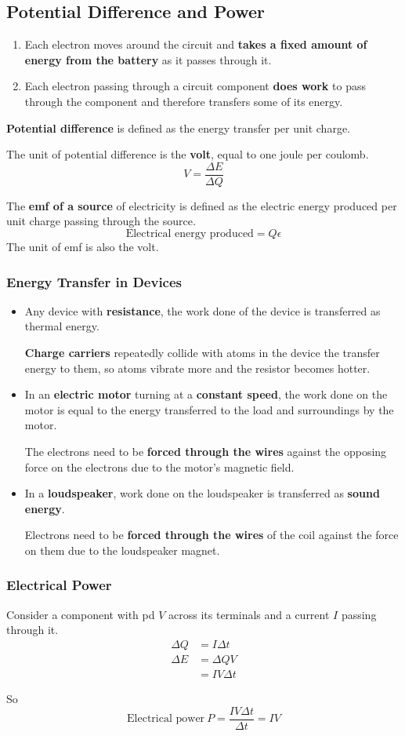\subsection{Potential Difference and Power}

\begin{enumerate}
    \item Each electron moves around the circuit and \textbf{takes a fixed amount of energy from the battery} as it passes through it.
    \item Each electron passing through a circuit component \textbf{does work} to pass through the component and therefore transfers some of its energy.
\end{enumerate}

\textbf{Potential difference} is defined as the energy transfer per unit charge.

The unit of potential difference is the \textbf{volt}, equal to one joule per coulomb.
$$V=\frac{\Delta E}{\Delta Q}$$

The \textbf{emf of a source} of electricity is defined as the electric energy produced per unit charge passing through the source.
$$\text{Electrical energy produced}=Q\epsilon$$
The unit of emf is also the volt.

\subsubsection*{Energy Transfer in Devices}
\begin{itemize}
    \item Any device with \textbf{resistance}, the work done of the device is transferred as thermal energy.

        \textbf{Charge carriers} repeatedly collide with atoms in the device the transfer energy to them, so atoms vibrate more and the resistor becomes hotter.
    \item In an \textbf{electric motor} turning at a \textbf{constant speed}, the work done on the motor is equal to the energy transferred to the load and surroundings by the motor.

        The electrons need to be \textbf{forced through the wires} against the opposing force on the electrons due to the motor's magnetic field.
    \item In a \textbf{loudspeaker}, work done on the loudspeaker is transferred as \textbf{sound energy}.

        Electrons need to be \textbf{forced through the wires} of the coil against the force on them due to the loudspeaker magnet.
\end{itemize}

\subsubsection*{Electrical Power}

Consider a component with pd $V$ across its terminals and a current $I$ passing through it.
\begin{align*}
    \Delta Q&=I\Delta t\\
    \Delta E&=\Delta QV\\
     &=IV\Delta t
\end{align*}

So
$$\text{Electrical power}\ P=\frac{IV\Delta t}{\Delta t}=IV$$
